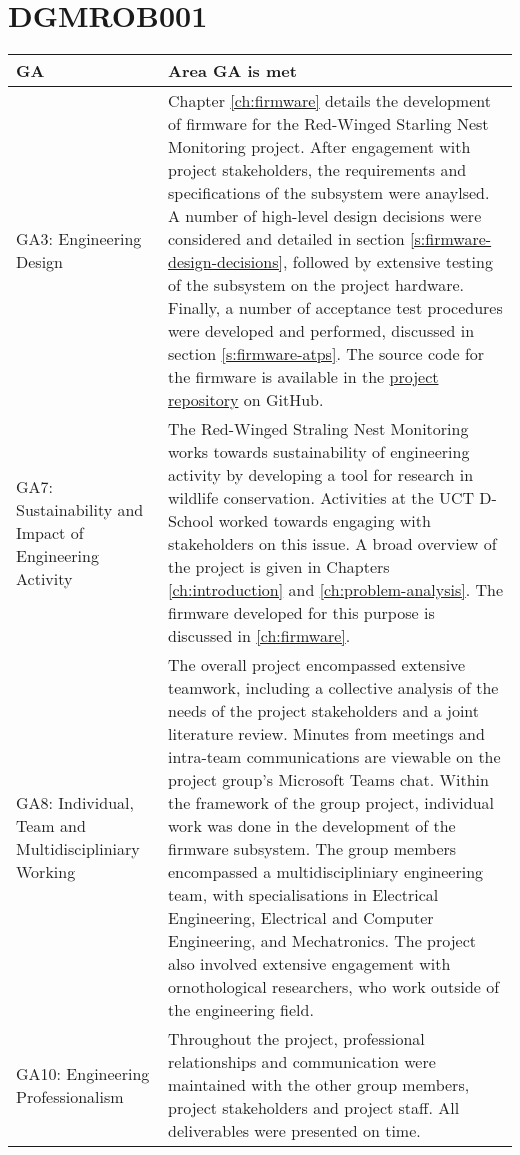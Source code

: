 \documentclass[class=report,11pt,crop=false]{standalone}
\begin{document}
\section{DGMROB001}

\centering
\begin{tabularx}{\textwidth}{|p{} X|}

    \hline
    \textbf{GA}  & \textbf{Area GA is met} \\ \hline

    GA3: Engineering Design & Chapter \ref{ch:firmware} details the development of firmware for the Red-Winged Starling Nest Monitoring project. After engagement with project stakeholders, the requirements and specifications of the subsystem were anaylsed. A number of high-level design decisions were considered and detailed in section \ref{s:firmware-design-decisions}, followed by extensive testing of the subsystem on the project hardware. Finally, a number of acceptance test procedures were developed and performed, discussed in section \ref{s:firmware-atps}. The source code for the firmware is available in the \href{https://github.com/rothdu/EEE4113F-Group13-2024}{project repository} on GitHub. \\ \hline

    GA7: Sustainability and Impact of Engineering Activity & The Red-Winged Straling Nest Monitoring works towards sustainability of engineering activity by developing a tool for research in wildlife conservation. Activities at the UCT D-School worked towards engaging with stakeholders on this issue. A broad overview of the project is given in Chapters \ref{ch:introduction} and \ref{ch:problem-analysis}. The firmware developed for this purpose is discussed in \ref{ch:firmware}.\\ \hline

    GA8: Individual, Team and Multidiscipliniary Working & The overall project encompassed extensive teamwork, including a collective analysis of the needs of the project stakeholders and a joint literature review. Minutes from meetings and intra-team communications are viewable on the project group's Microsoft Teams chat. Within the framework of the group project, individual work was done in the development of the firmware subsystem. The group members encompassed a multidiscipliniary engineering team, with specialisations in Electrical Engineering, Electrical and Computer Engineering, and Mechatronics. The project also involved extensive engagement with ornothological researchers, who work outside of the engineering field. \\ \hline

    GA10: Engineering Professionalism & Throughout the project, professional relationships and communication were maintained with the other group members, project stakeholders and project staff. All deliverables were presented on time. \\ \hline


\end{tabularx}
\raggedright
\end{document}
